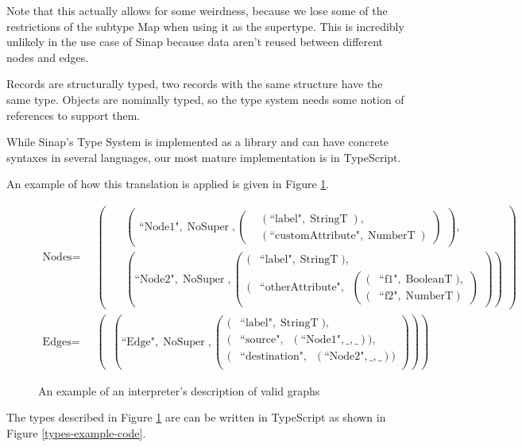 \documentclass{article}
\DeclareMathOperator{\StringT}{StringT}
\DeclareMathOperator{\NumberT}{NumberT}
\DeclareMathOperator{\BooleanT}{BooleanT}
\DeclareMathOperator{\RecT}{RecT_\Gamma}
\DeclareMathOperator{\ObjT}{ObjT_\Gamma}
\DeclareMathOperator{\UnionT}{UnionT_\Gamma}
\DeclareMathOperator{\NoSuper}{NoSuper}
\begin{document}
Note that this actually allows for some weirdness, because 
we lose some of the restrictions of the subtype Map when using
it as the supertype. This is incredibly unlikely in the use case 
of Sinap because data aren't reused between different nodes and
edges. 

Records are structurally typed, two records with the same structure have
the same type. Objects are nominally typed, so the type system needs some
notion of references to support them. 

While Sinap's Type System is implemented as a library and can have 
concrete syntaxes in several languages, our most mature implementation 
is in TypeScript. 

An example of how this translation is applied is given in Figure \ref{types-example}. 

\begin{figure}
\begin{mdframed}
\begin{align*}
    \text{Nodes} = &\UnionT\left(
        \begin{aligned}
        &\ObjT\left(
            \begin{aligned}    
                \text{``Node1"}, \NoSuper, \left(
                    \begin{aligned}
                        &(\text{``label"}, \StringT),  \\
                        &(\text{``customAttribute"}, \NumberT)
                    \end{aligned}\right)
            \end{aligned}\right),  \\
        &\ObjT\left(\text{``Node2"}, \NoSuper, \left(\begin{aligned}
            (&\text{``label"}, \StringT),  \\
            (&\text{``otherAttribute"}, \RecT\left(
                \begin{aligned}
                    (&\text{``f1"}, \BooleanT),  \\
                    (&\text{``f2"}, \NumberT)
                \end{aligned}\right)
        \end{aligned}\right)\right)
        \end{aligned}\right)  \\
    \text{Edges} = &\UnionT\left(\ObjT\left(
        \text{``Edge"}, \NoSuper,  
        \left(\begin{aligned}
            (&\text{``label"}, \StringT), \\
            (&\text{``source"}, \ObjT(\text{``Node1"}, \_, \_)), \\
            (&\text{``destination"}, \ObjT(\text{``Node2"}, \_, \_)) \\             
        \end{aligned}\right)\right)\right)
\end{align*}
\end{mdframed}
\caption{An example of an interpreter's description of valid graphs}
\label{types-example}
\end{figure}
The types described in Figure \ref{types-example} are
can be written in TypeScript as shown in Figure \ref{types-example-code}.
\end{document}
